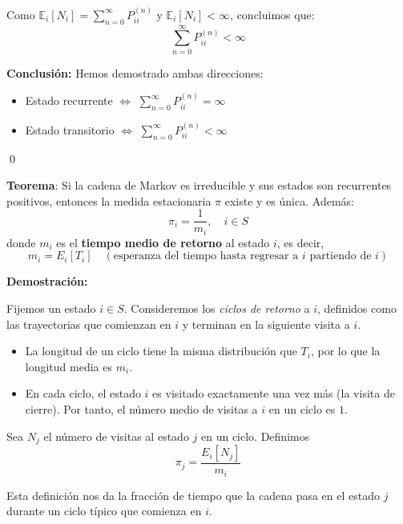 \documentclass[12pt,a4paper]{article}
\newcommand{\teorema}[1]{%
\begin{teoremabox}
\textbf{Teorema}: #1
\end{teoremabox}
}
\begin{document}
Como $\mathbb{E}_i[N_i] = \sum_{n=0}^{\infty} P_{ii}^{(n)}$ y $\mathbb{E}_i[N_i] < \infty$, concluimos que:
\begin{equation*}
\sum_{n=0}^{\infty} P_{ii}^{(n)} < \infty
\end{equation*}

\textbf{Conclusión:} Hemos demostrado ambas direcciones:
\begin{itemize}
\item Estado recurrente $\Leftrightarrow$ $\sum_{n=0}^{\infty} P_{ii}^{(n)} = \infty$
\item Estado transitorio $\Leftrightarrow$ $\sum_{n=0}^{\infty} P_{ii}^{(n)} < \infty$
\end{itemize}

\qed

\teorema{Si la cadena de Markov es irreducible y sus estados son recurrentes positivos, entonces la medida estacionaria $\pi$ existe y es única. Además:
\begin{equation*}
\pi_i = \frac{1}{m_i}, \quad i \in S
\end{equation*}
donde $m_i$ es el \textbf{tiempo medio de retorno} al estado $i$, es decir,
\begin{equation*}
m_i = E_i[T_i] \quad (\text{esperanza del tiempo hasta regresar a $i$ partiendo de $i$})
\end{equation*}
}

\textbf{Demostración:}

Fijemos un estado $i \in S$. Consideremos los \emph{ciclos de retorno} a $i$, definidos como las trayectorias que comienzan en $i$ y terminan en la siguiente visita a $i$.

\begin{itemize}
\item La longitud de un ciclo tiene la misma distribución que $T_i$, por lo que la longitud media es $m_i$.
\item En cada ciclo, el estado $i$ es visitado exactamente una vez más (la visita de cierre). Por tanto, el número medio de visitas a $i$ en un ciclo es $1$.
\end{itemize}

Sea $N_j$ el número de visitas al estado $j$ en un ciclo. Definimos
\begin{equation*}
\pi_j = \frac{E_i[N_j]}{m_i}
\end{equation*}

Esta definición nos da la fracción de tiempo que la cadena pasa en el estado $j$ durante un ciclo típico que comienza en $i$.
\end{document}
